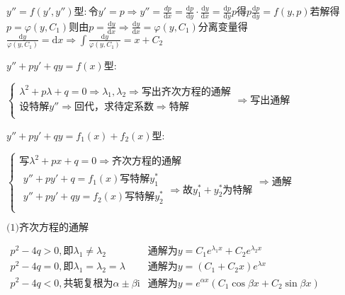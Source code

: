 \begin{spacing}{\hangju}
    \noindent $y''=f(y', y'')$型$\colon$令$y' = p \Rightarrow y'' = \frac{\mathrm{}{d}p}{\mathrm{d}x} = \frac{\mathrm{d}p}{\mathrm{d}y} \cdot \frac{\mathrm{d}y}{\mathrm{d}x} = \frac{\mathrm{d}p}{\mathrm{d}y}p$得$p\frac{\mathrm{d}p}{\mathrm{d}y} = f(y, p)$若解得$p = \varphi(y, C_1)$则由$p = \frac{\mathrm{d}y}{\mathrm{d}x} \Rightarrow \frac{\mathrm{d}y}{\mathrm{d}x} = \varphi(y, C_1)$分离变量得$\displaystyle \frac{\mathrm{d}y}{\varphi(y, C_1)} = \mathrm{d}x \Rightarrow \int{\frac{\mathrm{d}y}{\varphi(y, C_1)}} = x + C_2$

    \noindent $y'' + py' + qy = f(x)$型$\colon$

    \noindent $\left\{
        \begin{array}{l}
            \lambda^2 + p\lambda + q = 0 \Rightarrow \lambda_1, \lambda_2 \Rightarrow \mbox{写出齐次方程的通解}\\
            \mbox{设特解}y'' \Rightarrow \mbox{回代，求待定系数} \Rightarrow \mbox{特解} \\
        \end{array}
    \right.
    \Rightarrow \mbox{写出通解}$

    \noindent $y'' + py' + qy = f_1(x) + f_2(x)$型$\colon$

    \noindent $\left\{
        \begin{array}{l}
            \mbox{写}\lambda^2 + px + q = 0 \Rightarrow \mbox{齐次方程的通解} \\
            \begin{array}{l}
                y'' + py' + q = f_1(x) \mbox{写特解}y_{1}^{*} \\
                y'' + py' + qy = f_2(x) \mbox{写特解}y_{2}^{*} \\
            \end{array} \Rightarrow \mbox{故}y_{1}^{*} + y_{2}^{*}\mbox{为特解}
        \end{array}
    \right. \Rightarrow \mbox{通解}$

    \noindent $\mbox{(1)齐次方程的通解}$

    \noindent $\begin{array}{ll}
        p^2-4q > 0,\mbox{即} \lambda_1 \neq \lambda_2 & \mbox{通解为}y = C_1e^{\lambda_1x} + C_2e^{\lambda_2x}\\
        p^2-4q = 0,\mbox{即} \lambda_1 = \lambda_2 = \lambda & \mbox{通解为}y = (C_1 + C_2x)e^{\lambda x}\\
        p^2-4q < 0,\mbox{共轭复根为}\alpha \pm \beta \mathrm{i} & \mbox{通解为}y = e^{\alpha x}(C_1\cos{\beta x} + C_2\sin{\beta x})\\
    \end{array}$


\end{spacing}
